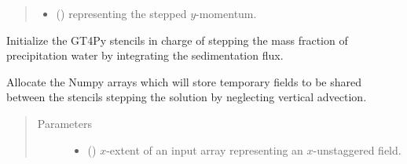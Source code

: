 \documentclass[letterpaper,10pt,english]{sphinxmanual}
\begin{document}
\begin{fulllineitems}
\begin{fulllineitems}
\begin{quote}
\begin{description}
\begin{itemize}
\item {} 
 () \textendash{}  representing the stepped \(y\)-momentum.

\end{itemize}


\end{description}\end{quote}

\end{fulllineitems}


\begin{fulllineitems}
\label{\detokenize{api:tasmania.dycore.prognostic_isentropic_forward_euler.PrognosticIsentropicForwardEuler._stencils_stepping_by_integrating_sedimentation_flux_initialize}}
Initialize the GT4Py stencils in charge of stepping the mass fraction of precipitation water by
integrating the sedimentation flux.

\end{fulllineitems}


\begin{fulllineitems}
\label{\detokenize{api:tasmania.dycore.prognostic_isentropic_forward_euler.PrognosticIsentropicForwardEuler._stencils_stepping_by_neglecting_vertical_advection_allocate_temporaries}}
Allocate the Numpy arrays which will store temporary fields to be shared between the stencils
stepping the solution by neglecting vertical advection.
\begin{quote}\begin{description}
\item[{Parameters}] \leavevmode\begin{itemize}
\item {} 
 () \textendash{} \(x\)-extent of an input array representing an \(x\)-unstaggered field.


\end{itemize}
\end{description}
\end{quote}
\end{fulllineitems}
\end{fulllineitems}
\end{document}
